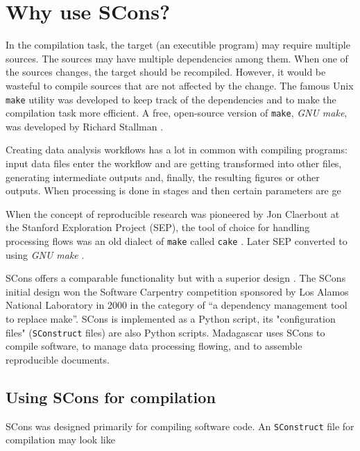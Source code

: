 \section{Why use SCons?}

In the compilation task, the target (an executible program) may
require multiple sources. The sources may have multiple dependencies
among them. When one of the sources changes, the target should be
recompiled. However, it would be wasteful to compile sources that are
not affected by the change. The famous Unix \texttt{make} utility was
developed to keep track of the dependencies and to make the
compilation task more efficient. A free, open-source version of
\texttt{make}, \emph{GNU make}, was developed by Richard Stallman
\cite[]{make}.

Creating data analysis workflows has a lot in common with compiling
programs: input data files enter the workflow and are getting
transformed into other files, generating intermediate outputs and,
finally, the resulting figures or other outputs. When processing is
done in stages and then certain parameters are ge

When the concept of reproducible research was pioneered by Jon
Claerbout at the Stanford Exploration Project (SEP), the tool of
choice for handling processing flows was an old dialect of
\texttt{make} called \texttt{cake}
\cite[]{Nichols.sep.61.341,Claerbout.sep.67.145,Claerbout.sep.73.451,Claerbout.sep.77.427}. Later
SEP converted to using \emph{GNU make} \cite{Schwab.sep.89.217}.

SCons offers a comparable functionality but with a superior design
\cite[]{dubois,scons,ieee}.  The SCons initial design won the Software
Carpentry competition sponsored by Los Alamos National Laboratory in
2000 in the category of ``a dependency management tool to replace
make''.  SCons is implemented as a Python script, its "configuration
files" (\texttt{SConstruct} files) are also Python scripts. Madagascar
uses SCons to compile software, to manage data processing flowing, and
to assemble reproducible documents.

\subsection{Using SCons for compilation}

SCons was designed primarily for compiling software code. An \texttt{SConstruct} file for compilation may look like


